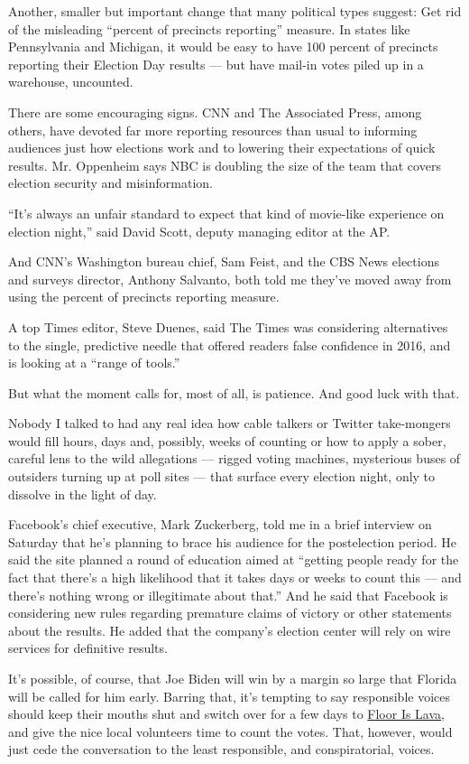 Another, smaller but important change that many political types suggest:
Get rid of the misleading ``percent of precincts reporting'' measure. In
states like Pennsylvania and Michigan, it would be easy to have 100
percent of precincts reporting their Election Day results --- but have
mail-in votes piled up in a warehouse, uncounted.

There are some encouraging signs. CNN and The Associated Press, among
others, have devoted far more reporting resources than usual to
informing audiences just how elections work and to lowering their
expectations of quick results. Mr. Oppenheim says NBC is doubling the
size of the team that covers election security and misinformation.

``It's always an unfair standard to expect that kind of movie-like
experience on election night,'' said David Scott, deputy managing editor
at the AP.

And CNN's Washington bureau chief, Sam Feist, and the CBS News elections
and surveys director, Anthony Salvanto, both told me they've moved away
from using the percent of precincts reporting measure.

A top Times editor, Steve Duenes, said The Times was considering
alternatives to the single, predictive needle that offered readers false
confidence in 2016, and is looking at a ``range of tools.''

But what the moment calls for, most of all, is patience. And good luck
with that.

Nobody I talked to had any real idea how cable talkers or Twitter
take-mongers would fill hours, days and, possibly, weeks of counting or
how to apply a sober, careful lens to the wild allegations --- rigged
voting machines, mysterious buses of outsiders turning up at poll sites
--- that surface every election night, only to dissolve in the light of
day.

Facebook's chief executive, Mark Zuckerberg, told me in a brief
interview on Saturday that he's planning to brace his audience for the
postelection period. He said the site planned a round of education aimed
at ``getting people ready for the fact that there's a high likelihood
that it takes days or weeks to count this --- and there's nothing wrong
or illegitimate about that.'' And he said that Facebook is considering
new rules regarding premature claims of victory or other statements
about the results. He added that the company's election center will rely
on wire services for definitive results.

It's possible, of course, that Joe Biden will win by a margin so large
that Florida will be called for him early. Barring that, it's tempting
to say responsible voices should keep their mouths shut and switch over
for a few days to
\href{https://www.youtube.com/watch?v=A3zkedeWbYw}{Floor Is Lava}, and
give the nice local volunteers time to count the votes. That, however,
would just cede the conversation to the least responsible, and
conspiratorial, voices.

